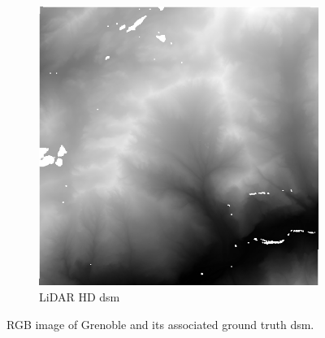 \begin{figure}
\begin{subfigure}[t]{0.48\linewidth}
        \includegraphics[width=\linewidth]{Images/Chap_6/miniature_Grenoble_gt.png}
        \caption{LiDAR HD \acrshort{dsm}}
        \label{fig:miniature_Grenoble_gt}
    \end{subfigure}
    \caption{RGB image of Grenoble and its associated ground truth \acrshort{dsm}.}
    \label{fig:miniature_Grenoble}
\end{figure}


